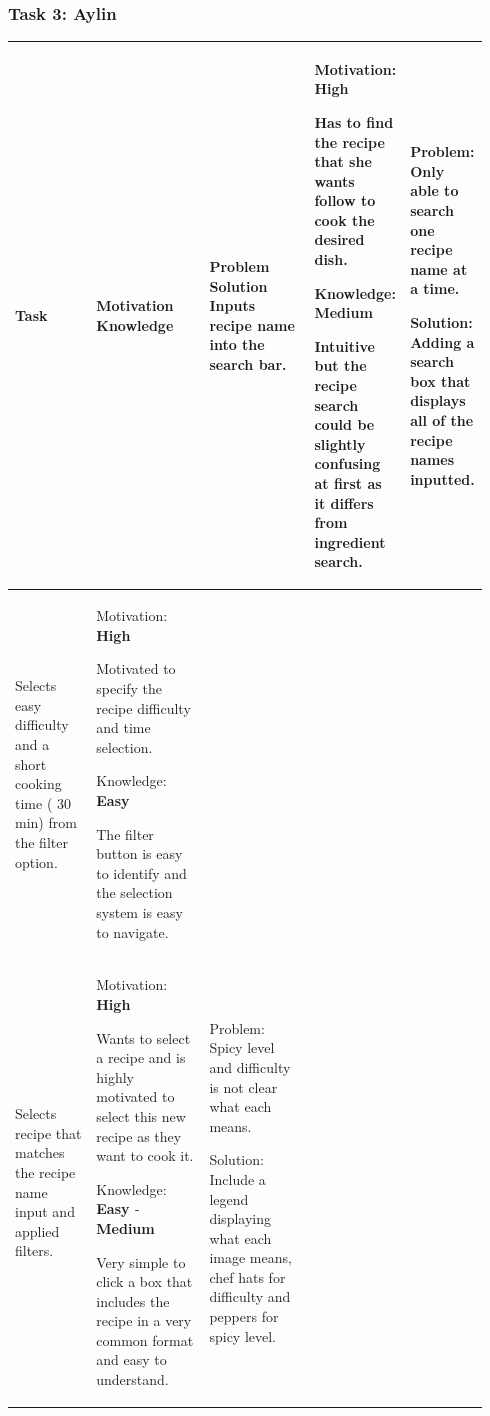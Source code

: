 \documentclass[11pt,english]{article}
\begin{document}
\subsubsection{Task 3: Aylin}
\begin{longtable}{!{\color{black}\vrule}>{\hspace{0pt}}m{0.248\linewidth}!{\color{black}\vrule}>{\hspace{0pt}}m{0.313\linewidth}!{\color{black}\vrule}>{\hspace{0pt}}m{0.377\linewidth}!{\color{black}\vrule}} \hline
Task & Motivation  Knowledge~ & Problem  Solution \endfirsthead \hline
Inputs recipe name into the search bar. & Motivation: \textbf{\textcolor[rgb]{0,0.502,0}{High}}\par{}Has to find the recipe that she wants follow to cook the desired dish.\par{}Knowledge: \textbf{\textcolor[rgb]{1,0.647,0}{Medium}}\par{}Intuitive but the recipe search could be slightly confusing at first as it differs from ingredient search. & Problem: Only able to search one recipe name at a time.\par{}Solution: Adding a search box that displays all of the recipe names inputted. \\ \hline
Selects easy difficulty and a short cooking time ( 30 min) from the filter option. & Motivation: \textbf{\textcolor[rgb]{0,0.502,0}{High}}\par{}Motivated to specify the recipe difficulty and time selection.\par{}Knowledge: \textbf{\textcolor[rgb]{0,0.502,0}{Easy}}\par{}The filter button is easy to identify and the selection system is easy to navigate. &  \\ \hline
Selects recipe that matches the recipe name input and applied filters. & Motivation: \textbf{\textcolor[rgb]{0,0.502,0}{High}}\par{}Wants to select a recipe and is highly motivated to select this new recipe as they want to cook it.\par{}Knowledge: \textbf{\textcolor[rgb]{0,0.502,0}{Easy }}- \textbf{\textcolor[rgb]{1,0.647,0}{Medium}}\par{}Very simple to click a box that includes the recipe in a very common format and easy to understand. & Problem: Spicy level and difficulty is not clear what each means.\par{}Solution: Include a legend displaying what each image means, chef hats for difficulty and peppers for spicy level. \\ \hline

\end{longtable}
\end{document}
